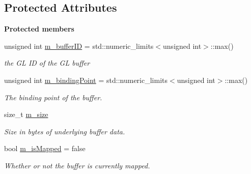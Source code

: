 \subsection*{Protected Attributes}
\begin{Indent}\textbf{ Protected members}\par
\begin{DoxyCompactItemize}
\item 
\mbox{\label{classrev_1_1_g_l_buffer_a3e54063a5a1902dc2b79cd0f81b72deb}} 
unsigned int \mbox{\hyperlink{classrev_1_1_g_l_buffer_a3e54063a5a1902dc2b79cd0f81b72deb}{m\+\_\+buffer\+ID}} = std\+::numeric\+\_\+limits$<$unsigned int$>$\+::max()
\begin{DoxyCompactList}\small\item\em the GL ID of the GL buffer \end{DoxyCompactList}\item 
unsigned int \mbox{\hyperlink{classrev_1_1_g_l_buffer_a81b6e473f0b5716fe5a2aeb24fde27ff}{m\+\_\+binding\+Point}} = std\+::numeric\+\_\+limits$<$unsigned int$>$\+::max()
\begin{DoxyCompactList}\small\item\em The binding point of the buffer. \end{DoxyCompactList}\item 
\mbox{\label{classrev_1_1_g_l_buffer_ac6d88fd8c038e2cd89dd40d0cebd0450}} 
size\+\_\+t \mbox{\hyperlink{classrev_1_1_g_l_buffer_ac6d88fd8c038e2cd89dd40d0cebd0450}{m\+\_\+size}}
\begin{DoxyCompactList}\small\item\em Size in bytes of underlying buffer data. \end{DoxyCompactList}\item 
\mbox{\label{classrev_1_1_g_l_buffer_a8f3c3cef8c9c165aee5415a789be1234}} 
bool \mbox{\hyperlink{classrev_1_1_g_l_buffer_a8f3c3cef8c9c165aee5415a789be1234}{m\+\_\+is\+Mapped}} = false
\begin{DoxyCompactList}\small\item\em Whether or not the buffer is currently mapped. \end{DoxyCompactList}\item 
\mbox{\label{classrev_1_1_g_l_buffer_a314ef90b0e12e3174fddaa8cb65c0857}} 

\end{DoxyCompactItemize}
\end{Indent}
